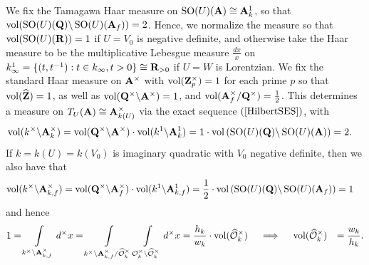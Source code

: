 \documentclass{amsart}
\theoremstyle{definition}
\theoremstyle{definition}
\theoremstyle{definition}
\begin{document}
We fix the Tamagawa Haar measure on $\operatorname{SO}(U)({\bf{A}}) \cong {\bf{A}}_k^1$, 
so that $\operatorname{vol}(\operatorname{SO}(U)({\bf{Q}}) \backslash \operatorname{SO}(U)({\bf{A}}_f))=2$.
Hence, we normalize the measure so that $\operatorname{vol}(\operatorname{SO}(U)({\bf{R}})) = 1$ if $U=V_0$ is negative definite, and otherwise take 
the Haar measure to be the multiplicative Lebesgue measure $\frac{dx}{x}$ on $k_{\infty}^1 = \lbrace (t, t^{-1}): t \in k_{\infty}, t>0 \rbrace \cong {\bf{R}}_{>0}$ if $U = W$ is Lorentzian. 
We fix the standard Haar measure on ${\bf{A}}^{\times}$ with $\operatorname{vol}({\bf{Z}}_p^{\times}) = 1$ for each prime $p$ so that 
$\operatorname{vol}(\widehat{\bf{Z}})=1$, as well as $\operatorname{vol}({\bf{Q}}^{\times} \backslash {\bf{A}}^{\times})=1$,
and $\operatorname{vol}({\bf{A}}_f^{\times}/{\bf{Q}}^{\times}) = \frac{1}{2}$. 
This determines a measure on $T_U({\bf{A}}) \cong {\bf{A}}_{k(U)}^{\times}$ via the exact sequence $(\ref{HilbertSES})$, with 
\begin{align*} \operatorname{vol} ( k^{\times} \backslash {\bf{A}}_{k}^{\times} )
&=  \operatorname{vol} (  {\bf{Q}}^{\times} \backslash {\bf{A}}^{\times} ) \cdot 
\operatorname{vol} (  k^1 \backslash {\bf{A}}_{k}^1 ) = 1 \cdot 
\operatorname{vol} \left( \operatorname{SO}(U)({\bf{Q}}) \backslash \operatorname{SO}(U)({\bf{A}}) \right) =2. \end{align*}
If $k = k(U) = k(V_0)$ is imaginary quadratic with $V_0$ negative definite, then we also have that 
\begin{align*} \operatorname{vol} ( k^{\times} \backslash {\bf{A}}_{k, f}^{\times} )
&=  \operatorname{vol} (  {\bf{Q}}^{\times} \backslash {\bf{A}}_f^{\times} ) \cdot 
\operatorname{vol} (  k^1 \backslash {\bf{A}}_{k, f}^1 ) = \frac{1}{2} \cdot 
\operatorname{vol} \left( \operatorname{SO}(U)({\bf{Q}}) \backslash \operatorname{SO}(U)({\bf{A}}_f) \right) =1 \end{align*}
and hence 
\begin{equation}\begin{aligned}\label{measures} 1 &= \int\limits_{ k^{\times} \backslash {\bf{A}}_{k, f}^{\times} } d^{\times} x = 
\int\limits_{ k^{\times} \backslash {\bf{A}}_{k, f}^{\times}/ \widehat{\mathcal{O}}_k^{\times} } 
\int\limits_{ \mathcal{O}_k^{\times} \backslash \widehat{\mathcal{O}}_k^{\times} } d^{\times} x 
= \frac{h_k}{w_k} \cdot \operatorname{vol} (\widehat{\mathcal{O}}_k^{\times}) \quad \implies \quad
\operatorname{vol}(\widehat{\mathcal{O}}_k^{\times}) &= \frac{w_k}{h_k} . \end{aligned}\end{equation} 
\end{document}
